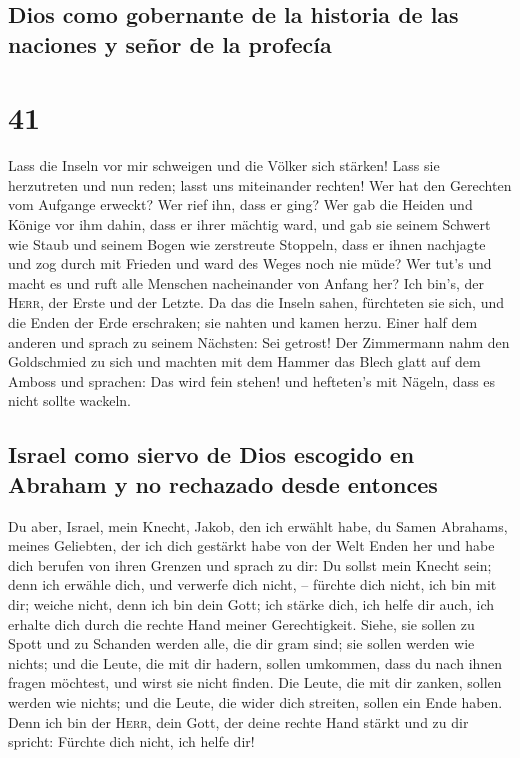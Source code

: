 \hypertarget{dios-como-gobernante-de-la-historia-de-las-naciones-y-seuxf1or-de-la-profecuxeda}{%
\subsection{Dios como gobernante de la historia de las naciones y señor
de la
profecía}\label{dios-como-gobernante-de-la-historia-de-las-naciones-y-seuxf1or-de-la-profecuxeda}}

\hypertarget{section-40}{%
\section{41}\label{section-40}}

 Lass die Inseln vor mir schweigen und die Völker sich
stärken! Lass sie herzutreten und nun reden; lasst uns miteinander
rechten!  Wer hat den Gerechten vom Aufgange erweckt? Wer
rief ihn, dass er ging? Wer gab die Heiden und Könige vor ihm dahin,
dass er ihrer mächtig ward, und gab sie seinem Schwert wie Staub und
seinem Bogen wie zerstreute Stoppeln,  dass er ihnen
nachjagte und zog durch mit Frieden und ward des Weges noch nie müde?
 Wer tut's und macht es und ruft alle Menschen
nacheinander von Anfang her? Ich bin's, der \textsc{Herr}, der Erste und
der Letzte.  Da das die Inseln sahen, fürchteten sie sich,
und die Enden der Erde erschraken; sie nahten und kamen herzu.
 Einer half dem anderen und sprach zu seinem Nächsten: Sei
getrost!  Der Zimmermann nahm den Goldschmied zu sich und
machten mit dem Hammer das Blech glatt auf dem Amboss und sprachen: Das
wird fein stehen! und hefteten's mit Nägeln, dass es nicht sollte
wackeln.

\hypertarget{israel-como-siervo-de-dios-escogido-en-abraham-y-no-rechazado-desde-entonces}{%
\subsection{Israel como siervo de Dios escogido en Abraham y no
rechazado desde
entonces}\label{israel-como-siervo-de-dios-escogido-en-abraham-y-no-rechazado-desde-entonces}}

 Du aber, Israel, mein Knecht, Jakob, den ich erwählt
habe, du Samen Abrahams, meines Geliebten,  der ich dich
gestärkt habe von der Welt Enden her und habe dich berufen von ihren
Grenzen und sprach zu dir: Du sollst mein Knecht sein; denn ich erwähle
dich, und verwerfe dich nicht, --  fürchte dich nicht,
ich bin mit dir; weiche nicht, denn ich bin dein Gott; ich stärke dich,
ich helfe dir auch, ich erhalte dich durch die rechte Hand meiner
Gerechtigkeit.  Siehe, sie sollen zu Spott und zu
Schanden werden alle, die dir gram sind; sie sollen werden wie nichts;
und die Leute, die mit dir hadern, sollen umkommen,  dass
du nach ihnen fragen möchtest, und wirst sie nicht finden. Die Leute,
die mit dir zanken, sollen werden wie nichts; und die Leute, die wider
dich streiten, sollen ein Ende haben.  Denn ich bin der
\textsc{Herr}, dein Gott, der deine rechte Hand stärkt und zu dir
spricht: Fürchte dich nicht, ich helfe dir!

